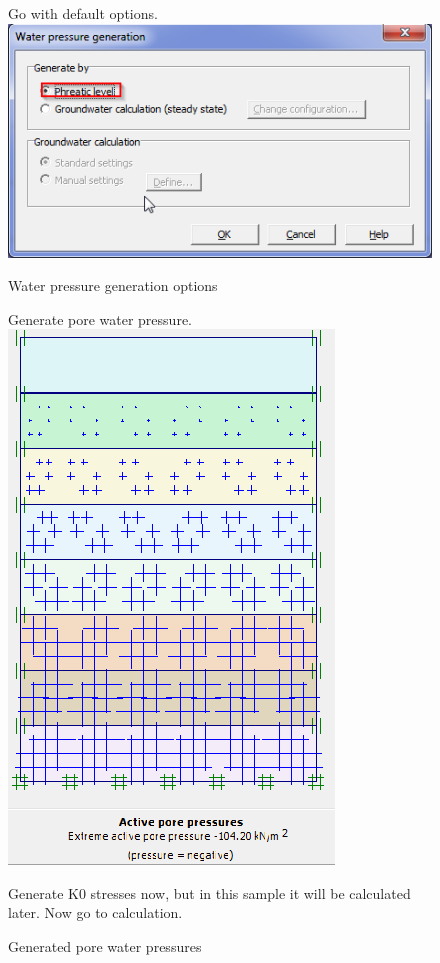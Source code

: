 \begin{figure}[hbtp]
  \centering
  Go with default options.
  \includegraphics[height=0.25\textheight]{images/plx/a (9).png}
  \caption{Water pressure generation options}
  \vfill
  Generate pore water pressure.\\
  \includegraphics[height=0.45\textheight]{images/plx/a (10).png}
  \caption{Generated pore water pressures}
  Generate K0 stresses now, but in this sample it will be calculated later. Now go to calculation.
\end{figure}
\pagebreak

